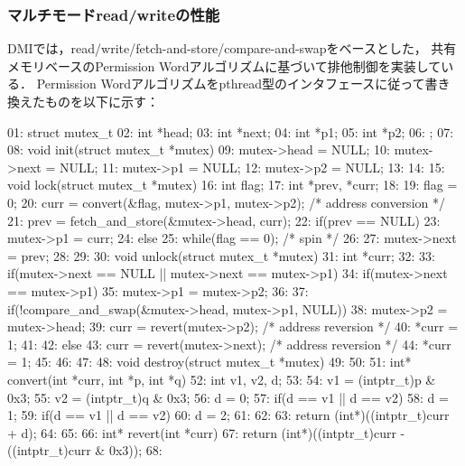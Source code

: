 \documentclass[10pt]{jsarticle}
\begin{document}
\subsubsection{マルチモードread/writeの性能}
\label{sec:perform_multi}

DMIでは，read/write/fetch-and-store/compare-and-swapをベースとした，
共有メモリベースのPermission Wordアルゴリズムに基づいて排他制御を実装している．
Permission Wordアルゴリズムをpthread型のインタフェースに従って書き換えたものを以下に示す：

\begin{code}
01: struct mutex_t {
02:   int *head;
03:   int *next;
04:   int *p1;
05:   int *p2;
06: };
07: 
08: void init(struct mutex_t *mutex) {
09:   mutex->head = NULL;
10:   mutex->next = NULL;
11:   mutex->p1 = NULL;
12:   mutex->p2 = NULL;
13: }
14: 
15: void lock(struct mutex_t *mutex) {
16:   int flag;
17:   int *prev, *curr;
18:   
19:   flag = 0;
20:   curr = convert(&flag, mutex->p1, mutex->p2);
                          /* address conversion */
21:   prev = fetch_and_store(&mutex->head, curr);
22:   if(prev == NULL) {
23:     mutex->p1 = curr;
24:   } else {
25:     while(flag == 0); /* spin */
26:   }
27:   mutex->next = prev;
28: }
29: 
30: void unlock(struct mutex_t *mutex) {
31:   int *curr;
32:   
33:   if(mutex->next == NULL 
         || mutex->next == mutex->p1) {
34:     if(mutex->next == mutex->p1) {
35:       mutex->p1 = mutex->p2;
36:     }
37:     if(!compare_and_swap(&mutex->head, mutex->p1, NULL)) {
38:       mutex->p2 = mutex->head;
39:       curr = revert(mutex->p2); /* address reversion */
40:       *curr = 1;
41:     }
42:   } else {
43:     curr = revert(mutex->next); /* address reversion */
44:     *curr = 1;
45:   }
46: }
47: 
48: void destroy(struct mutex_t *mutex) {
49: }
50: 
51: int* convert(int *curr, int *p, int *q) {
52:   int v1, v2, d;
53:   
54:   v1 = (intptr_t)p & 0x3;
55:   v2 = (intptr_t)q & 0x3;
56:   d = 0;
57:   if(d == v1 || d == v2) {
58:     d = 1;
59:     if(d == v1 || d == v2) {
60:       d = 2;
61:     }
62:   }
63:   return (int*)((intptr_t)curr + d);
64: }
65: 
66: int* revert(int *curr) {
67:   return (int*)((intptr_t)curr - ((intptr_t)curr & 0x3));
68: }
\end{code}
\end{document}
